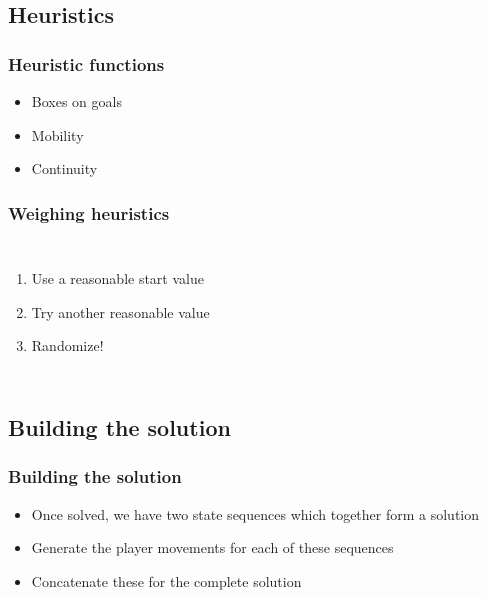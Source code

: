 \documentclass[]{beamer}
\begin{document}
\subsection{Heuristics}
\begin{frame}
	\frametitle{Heuristic functions}
	\begin{itemize}
		\item{Boxes on goals}
		\item{Mobility}
		\item{Continuity}
	\end{itemize}
\end{frame}

\begin{frame}
	\frametitle{Weighing heuristics}
	\begin{columns}
	\begin{enumerate}
		\item{Use a reasonable start value}
		\item{Try another reasonable value}
		\item{Randomize!}
	\end{enumerate}
	\end{columns}
\end{frame}

\subsection{Building the solution}
\begin{frame}
	\frametitle{Building the solution}
	\begin{itemize}
		\item{Once solved, we have two state sequences which together form a solution}
		\item{Generate the player movements for each of these sequences}
		\item{Concatenate these for the complete solution}
	\end{itemize}
\end{frame}
\end{document}
